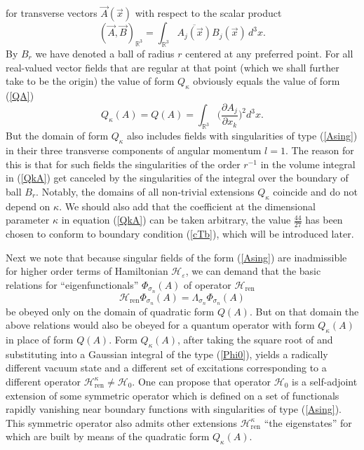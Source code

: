 \documentclass[12pt]{article}
\newcommand{\ol}{\overline}
\newcommand{\HH}{\mathscr{H}}
\newcommand{\RR}{\mathbb{R}}
\newcommand{\ve}{\varepsilon}
\begin{document}
	for transverse vectors
$ \vec{A}(\vec{x}) $
	with respect to the scalar product
\begin{equation*}
    (\vec{A},\vec{B})_{\RR^{3}} = \int_{\RR^{3}}
	\ol{A_{j}(\vec{x})} B_{j}(\vec{x}) \,d^{3}x .
\end{equation*}
	By
$ B_{r} $ we have denoted a ball of radius
$ r $
	centered at any preferred point.
    For all real-valued vector fields that are regular at that point
    (which we shall further take to be the origin) the value of form
$ Q_{\kappa} $
	obviously equals the value of form
(\ref{QA})
\begin{equation*}
        Q_{\kappa}(A) = Q(A) = \int_{\RR^{3}}
        \bigl(\frac{\partial A_{j}}{\partial x_{k}}\bigr)^{2} d^{3} x .
\end{equation*}
	But the domain of form
$ Q_{\kappa} $
	also includes fields with singularities of type
(\ref{Asing})
	in their three transverse components
	of angular momentum
$ l=1 $.
	The reason for this is that for such fields
	the singularities of the order
$ r^{-1} $
	in the volume integral in
(\ref{QkA})
	get canceled by the singularities of the integral over the boundary of
    ball
$ B_{r} $.
	Notably, the domains of all non-trivial extensions
$ Q_{\kappa} $
	coincide and do not depend on
$ \kappa $.
	We should also add that the coefficient at the dimensional parameter
$ \kappa $
	in equation
(\ref{QkA})
	can be taken arbitrary,
	the value
$ \frac{44}{27} $
	has been chosen to conform to boundary condition
(\ref{cTb}),
	which will be introduced later.

	Next we note that
	because singular fields of the form
(\ref{Asing})
	are inadmissible for higher order terms of Hamiltonian
$ \HH_{\ve} $,
    we can demand that the basic relations for
    ``eigenfunctionals''
$ \Phi_{\sigma_{n}}(A) $
	of operator
$ \HH_{\text{ren}} $
\begin{equation*}
    \HH_{\text{ren}} \Phi_{\sigma_{n}}(A)
	= \Lambda_{\sigma_{n}} \Phi_{\sigma_{n}}(A)
\end{equation*}
	be obeyed only on the domain of quadratic form
$ Q(A) $.
	But on that domain the above relations would also be obeyed
	for a quantum operator with form
$ Q_{\kappa}(A) $
	in place of form
$ Q(A) $.
	Form
$ Q_{\kappa}(A) $,
	after taking the square root of and substituting into a Gaussian integral
	of the type 
(\ref{Phi0}),
	yields a radically different vacuum state and a different set of
	excitations corresponding to a different operator
$ \HH_{\text{ren}}^{\kappa} \neq \HH_{0} $.
	One can propose that operator
$ \HH_{0} $
	is a self-adjoint extension of some symmetric operator
	which is defined on a set of functionals rapidly vanishing near
	boundary functions with singularities of type
(\ref{Asing}).
	This symmetric operator also admits other extensions 
$ \HH_{\text{ren}}^{\kappa} $
	``the eigenstates'' for which are built by means of the quadratic form
$ Q_{\kappa}(A) $.
\end{document}
